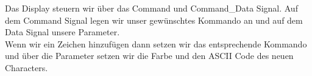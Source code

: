 Das Display steuern wir über das Command und Command\_Data Signal. Auf dem Command Signal legen wir unser gewünschtes Kommando an und auf dem Data Signal unsere Parameter.\\
Wenn wir ein Zeichen hinzufügen dann setzen wir das entsprechende Kommando und über die Parameter setzen wir die Farbe und den ASCII Code des neuen Characters.